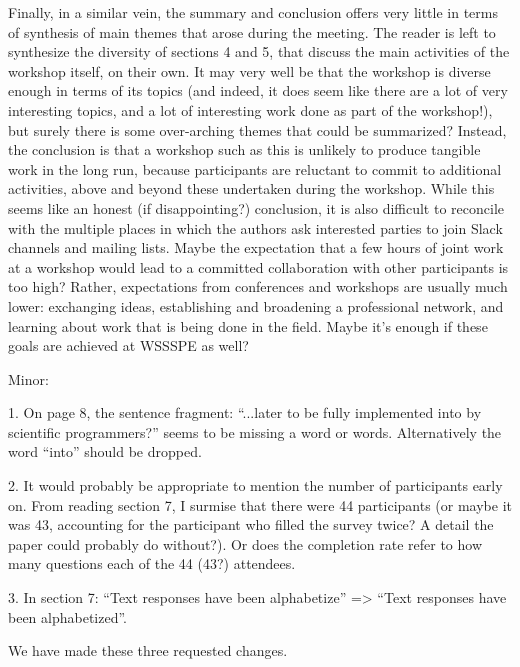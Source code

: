 \documentclass[11pt]{article}
\begin{document}
\begin{quoting}
Finally, in a similar vein, the summary and conclusion offers very little in terms of synthesis of main themes that arose during the meeting. The reader is left to synthesize the diversity of sections 4 and 5, that discuss the main activities of the workshop itself, on their own. It may very well be that the workshop is diverse enough in terms of its topics (and indeed, it does seem like there are a lot of very interesting topics, and a lot of interesting work done as part of the workshop!), but surely there is some over-arching themes that could be summarized? Instead, the conclusion is that a workshop such as this is unlikely to produce tangible work in the long run, because participants are reluctant to commit to additional activities, above and beyond these undertaken during the workshop. While this seems like an honest (if disappointing?) conclusion, it is also difficult to reconcile with the multiple places in which the authors ask interested parties to join Slack channels and mailing lists. Maybe the expectation that a few hours of joint work at a workshop would lead to a committed collaboration with other participants is too high? Rather, expectations from conferences and workshops are usually much lower: exchanging ideas, establishing and broadening a professional network, and learning about work that is being done in the field. Maybe it's enough if these goals are achieved at WSSSPE as well?

Minor: 

1. On page 8, the sentence fragment: ``...later to be fully implemented into by scientific programmers?'' seems to be missing a word or words. Alternatively the word ``into'' should be dropped.

2. It would probably be appropriate to mention the number of participants early on. From reading section 7, I surmise that there were 44 participants (or maybe it was 43, accounting for the participant who filled the survey twice? A detail the paper could probably do without?). Or does the completion rate refer to how many questions each of the 44 (43?) attendees. 

3. In section 7: ``Text responses have been alphabetize'' => ``Text responses have been alphabetized''.
\end{quoting}

We have made these three requested changes.

\end{document}
